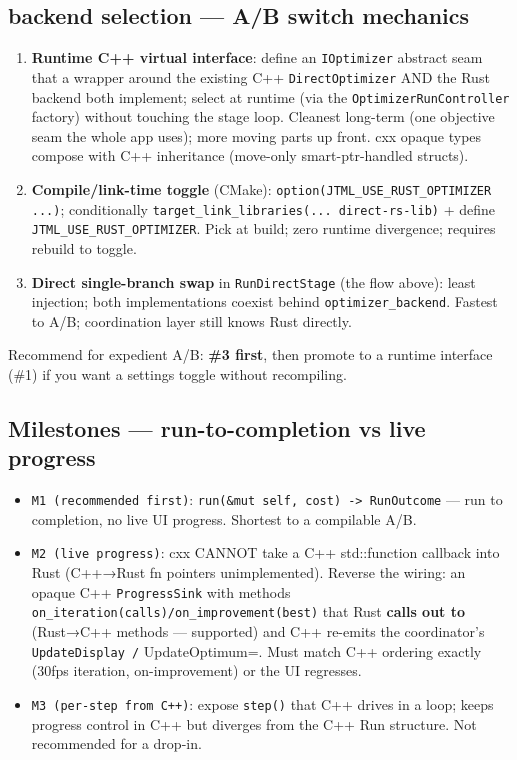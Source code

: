 \documentclass[11pt]{article}
\begin{document}
\subsection{backend selection — A/B switch mechanics}
\label{sec:org08d52fb}

\begin{enumerate}
\item \textbf{Runtime C++ virtual interface}: define an \texttt{IOptimizer} abstract seam that a
wrapper around the existing C++ \texttt{DirectOptimizer} AND the Rust backend both
implement; select at runtime (via the \texttt{OptimizerRunController} factory)
without touching the stage loop. Cleanest long-term (one objective seam the
whole app uses); more moving parts up front. cxx opaque types compose with
C++ inheritance (move-only smart-ptr-handled structs).
\item \textbf{Compile/link-time toggle} (CMake): \texttt{option(JTML\_USE\_RUST\_OPTIMIZER ...)};
conditionally \texttt{target\_link\_libraries(... direct-rs-lib)} + define
\texttt{JTML\_USE\_RUST\_OPTIMIZER}. Pick at build; zero runtime divergence; requires
rebuild to toggle.
\item \textbf{Direct single-branch swap} in \texttt{RunDirectStage} (the flow above): least
injection; both implementations coexist behind \texttt{optimizer\_backend}. Fastest
to A/B; coordination layer still knows Rust directly.
\end{enumerate}

Recommend for expedient A/B: \textbf{\textbf{\#3 first}}, then promote to a runtime interface
(\#1) if you want a settings toggle without recompiling.
\subsection{Milestones — run-to-completion vs live progress}
\label{sec:org2b12e68}

\begin{itemize}
\item \texttt{M1 (recommended first)}: \texttt{run(\&mut self, cost) -> RunOutcome} — run to
completion, no live UI progress. Shortest to a compilable A/B.
\item \texttt{M2 (live progress)}: cxx CANNOT take a C++ std::function callback into Rust
(C++→Rust fn pointers unimplemented). Reverse the wiring: an opaque C++
\texttt{ProgressSink} with methods \texttt{on\_iteration(calls)/on\_improvement(best)} that
Rust \textbf{calls out to} (Rust→C++ methods — supported) and C++ re-emits the
coordinator's \texttt{UpdateDisplay /} UpdateOptimum=. Must match C++ ordering exactly (30fps
iteration, on-improvement) or the UI regresses.
\item \texttt{M3 (per-step from C++)}: expose \texttt{step()} that C++ drives in a loop; keeps
progress control in C++ but diverges from the C++ Run structure. Not
recommended for a drop-in.
\end{itemize}
\end{document}
